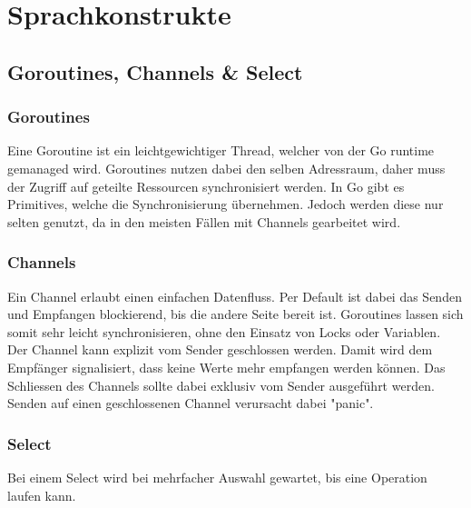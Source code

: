 \documentclass[12pt,titlepage]{article}
\begin{document}
\section{Sprachkonstrukte}
\subsection{Goroutines, Channels \& Select}
\subsubsection{Goroutines}
Eine Goroutine ist ein leichtgewichtiger Thread, welcher von der Go runtime gemanaged wird. Goroutines nutzen dabei den selben Adressraum, daher muss der Zugriff auf geteilte Ressourcen synchronisiert werden. In Go gibt es Primitives, welche die Synchronisierung übernehmen. Jedoch werden diese nur selten genutzt, da in den meisten Fällen mit Channels gearbeitet wird. 
\subsubsection{Channels}
Ein Channel erlaubt einen einfachen Datenfluss. Per Default ist dabei das Senden und Empfangen blockierend, bis die andere Seite bereit ist. Goroutines lassen sich somit sehr leicht synchronisieren, ohne den Einsatz von Locks oder Variablen. Der Channel kann explizit vom Sender geschlossen werden. Damit wird dem Empfänger signalisiert, dass keine Werte mehr empfangen werden können. Das Schliessen des Channels sollte dabei exklusiv vom Sender ausgeführt werden. Senden auf einen geschlossenen Channel verursacht dabei "panic".

\subsubsection{Select}
Bei einem Select wird bei mehrfacher Auswahl gewartet, bis eine Operation laufen kann. 
\end{document}
